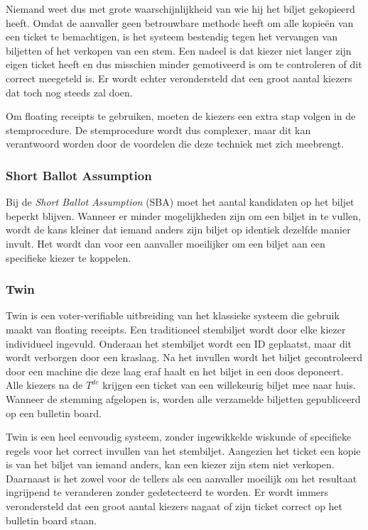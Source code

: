 \npar Niemand weet dus met grote waarschijnlijkheid van wie hij het biljet gekopieerd heeft. Omdat de aanvaller geen betrouwbare methode heeft om alle kopie\"en van een ticket te bemachtigen, is het systeem bestendig tegen het vervangen van biljetten of het verkopen van een stem. Een nadeel is dat kiezer niet langer zijn eigen ticket heeft en dus misschien minder gemotiveerd is om te controleren of dit correct meegeteld is. Er wordt echter verondersteld dat een groot aantal kiezers dat toch nog steeds zal doen.

\npar Om floating receipts te gebruiken, moeten de kiezers een extra stap volgen in de stemprocedure. De stemprocedure wordt dus complexer, maar dit kan verantwoord worden door de voordelen die deze techniek met zich meebrengt.

\subsubsection{Short Ballot Assumption}
\label{sec:ls:short_ballot_assumption}

Bij de \textit{Short Ballot Assumption} (SBA) moet het aantal kandidaten op het biljet beperkt blijven. Wanneer er minder mogelijkheden zijn om een biljet in te vullen, wordt de kans kleiner dat iemand anders zijn biljet op identiek dezelfde manier invult. Het wordt dan voor een aanvaller moeilijker om een biljet aan een specifieke kiezer te koppelen.\cite{cichon_kutylowski_weglorz_short_ballot_assumption}

\subsubsection{Twin~\cite{rivest_smith_three_voting_protocols}}
\label{sec:ls:twin}

Twin is een voter-verifiable uitbreiding van het klassieke systeem die gebruik maakt van floating receipts. Een traditioneel stembiljet wordt door elke kiezer individueel ingevuld. Onderaan het stembiljet wordt een ID geplaatst, maar dit wordt verborgen door een kraslaag. Na het invullen wordt het biljet gecontroleerd door een machine die deze laag eraf haalt en het biljet in een doos deponeert. Alle kiezers na de $T^{de}$ krijgen een ticket van een willekeurig biljet mee naar huis. Wanneer de stemming afgelopen is, worden alle verzamelde biljetten gepubliceerd op een bulletin board.

\npar Twin is een heel eenvoudig systeem, zonder ingewikkelde wiskunde of specifieke regels voor het correct invullen van het stembiljet. Aangezien het ticket een kopie is van het biljet van iemand anders, kan een kiezer zijn stem niet verkopen. Daarnaast is het zowel voor de tellers als een aanvaller moeilijk om het resultaat ingrijpend te veranderen zonder gedetecteerd te worden. Er wordt immers verondersteld dat een groot aantal kiezers nagaat of zijn ticket correct op het bulletin board staan.

